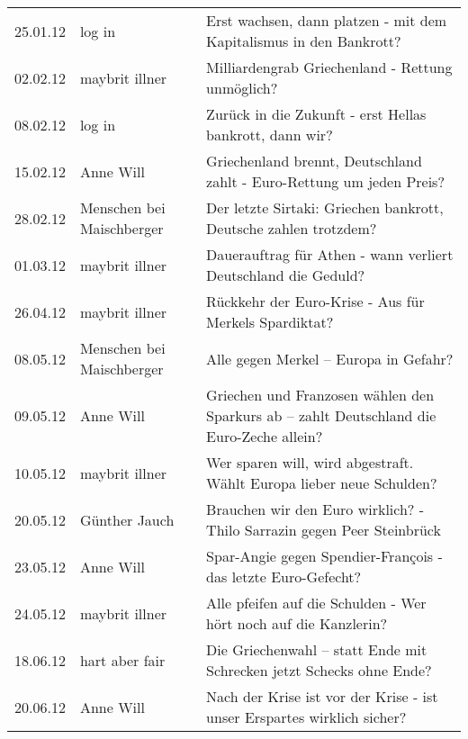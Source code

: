 \begin{table}[!htp]
{\begin{tabular}{@{}lll@{}}
			25.01.12       & log in                    & Erst wachsen, dann platzen - mit dem Kapitalismus in den Bankrott?                       \\
			02.02.12       & maybrit illner            & Milliardengrab Griechenland - Rettung unmöglich?                                         \\
			08.02.12       & log in                    & Zurück in die Zukunft - erst Hellas bankrott, dann wir?                                  \\
			15.02.12       & Anne Will                 & Griechenland brennt, Deutschland zahlt - Euro-Rettung um jeden Preis?                    \\
			28.02.12       & Menschen bei Maischberger & Der letzte Sirtaki: Griechen bankrott, Deutsche zahlen trotzdem?                         \\
			01.03.12       & maybrit illner            & Dauerauftrag für Athen - wann verliert Deutschland die Geduld?                           \\
			26.04.12       & maybrit illner            & Rückkehr der Euro-Krise - Aus für Merkels Spardiktat?                                    \\
			08.05.12       & Menschen bei Maischberger & Alle gegen Merkel – Europa in Gefahr?                                                    \\
			09.05.12       & Anne Will                 & Griechen und Franzosen wählen den Sparkurs ab – zahlt Deutschland die Euro-Zeche allein? \\
			10.05.12       & maybrit illner            & Wer sparen will, wird abgestraft. Wählt Europa lieber neue Schulden?                     \\
			20.05.12       & Günther Jauch             & Brauchen wir den Euro wirklich? - Thilo Sarrazin gegen Peer Steinbrück                   \\
			23.05.12       & Anne Will                 & Spar-Angie gegen Spendier-François - das letzte Euro-Gefecht?                            \\
			24.05.12       & maybrit illner            & Alle pfeifen auf die Schulden - Wer hört noch auf die Kanzlerin?                         \\
			18.06.12       & hart aber fair            & Die Griechenwahl – statt Ende mit Schrecken jetzt Schecks ohne Ende?                     \\
			20.06.12       & Anne Will                 & Nach der Krise ist vor der Krise - ist unser Erspartes wirklich sicher?                  \\

\end{tabular}}
\end{table}
